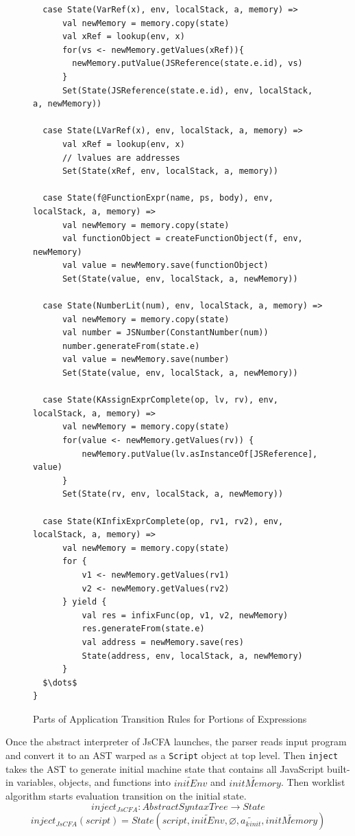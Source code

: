 \documentclass{article}
\begin{document}
\begin{figure}
\lstset{language=Scala, mathescape}
\begin{lstlisting}
  case State(VarRef(x), env, localStack, a, memory) =>
      val newMemory = memory.copy(state)
      val xRef = lookup(env, x)
      for(vs <- newMemory.getValues(xRef)){
        newMemory.putValue(JSReference(state.e.id), vs)
      }
      Set(State(JSReference(state.e.id), env, localStack, a, newMemory))

  case State(LVarRef(x), env, localStack, a, memory) =>
      val xRef = lookup(env, x)
      // lvalues are addresses
      Set(State(xRef, env, localStack, a, memory))

  case State(f@FunctionExpr(name, ps, body), env, localStack, a, memory) =>
      val newMemory = memory.copy(state)
      val functionObject = createFunctionObject(f, env, newMemory)
      val value = newMemory.save(functionObject)
      Set(State(value, env, localStack, a, newMemory))

  case State(NumberLit(num), env, localStack, a, memory) =>
      val newMemory = memory.copy(state)
      val number = JSNumber(ConstantNumber(num))
      number.generateFrom(state.e)
      val value = newMemory.save(number)
      Set(State(value, env, localStack, a, newMemory))

  case State(KAssignExprComplete(op, lv, rv), env, localStack, a, memory) =>
      val newMemory = memory.copy(state)
      for(value <- newMemory.getValues(rv)) {
          newMemory.putValue(lv.asInstanceOf[JSReference], value)
      }
      Set(State(rv, env, localStack, a, newMemory))

  case State(KInfixExprComplete(op, rv1, rv2), env, localStack, a, memory) =>
      val newMemory = memory.copy(state)
      for {
          v1 <- newMemory.getValues(rv1)
          v2 <- newMemory.getValues(rv2)
      } yield {
          val res = infixFunc(op, v1, v2, newMemory)
          res.generateFrom(state.e)
          val address = newMemory.save(res)
          State(address, env, localStack, a, newMemory)
      }
  $\dots$
}
\end{lstlisting}
\caption{Parts of Application Transition Rules for Portions of Expressions}
\label{fig:app-expr}
\end{figure}

Once the abstract interpreter of JsCFA launches, the parser reads input program and convert it to an AST warped as a \verb|Script| object at top level.
Then \verb|inject| takes the AST to generate initial machine state that contains all JavaScript built-in variables, objects, and functions into $\widetilde{initEnv}$ and $\widetilde{initMemory}$. Then worklist algorithm starts evaluation transition on the initial state.
\[
inject_{JsCFA} : AbstractSyntaxTree \to State
\]
\[
inject_{JsCFA}(script) = State(script, \widetilde{initEnv}, \varnothing, \widetilde{a_k{}_{init}}, \widetilde{initMemory})
\]
\end{document}
